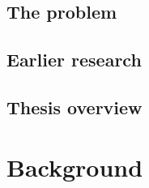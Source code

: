 \documentclass[12pt]{article}
\newcommand{\1}{\mathbbm{1}}
\begin{document}
\subsection{The problem}

\subsection{Earlier research}

\subsection{Thesis overview}

\newpage
\section{Background}
\end{document}
